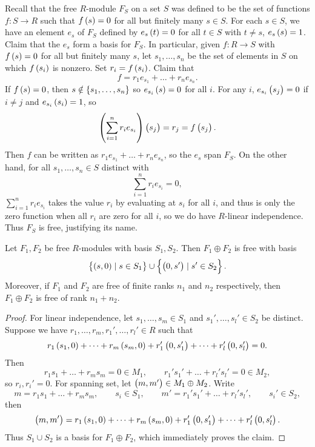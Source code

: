 Recall that the free $ R $-module $ F_S $ on a set $ S $ was defined to be the set of functions $ f : S \to R $ such that $ f\br{s} = 0 $ for all but finitely many $ s \in S $. For each $ s \in S $, we have an element $ e_s $ of $ F_S $ defined by $ e_s\br{t} = 0 $ for all $ t \in S $ with $ t \ne s $, $ e_s\br{s} = 1 $. Claim that the $ e_s $ form a basis for $ F_S $. In particular, given $ f : R \to S $ with $ f\br{s} = 0 $ for all but finitely many $ s $, let $ s_1, \dots, s_n $ be the set of elements in $ S $ on which $ f\br{s_i} $ is nonzero. Set $ r_i = f\br{s_i} $. Claim that
$$ f = r_1e_{s_1} + \dots + r_ne_{s_n}. $$
If $ f\br{s} = 0 $, then $ s \notin \cbr{s_1, \dots, s_n} $ so $ e_{s_i}\br{s} = 0 $ for all $ i $. For any $ i $, $ e_{s_i}\br{s_j} = 0 $ if $ i \ne j $ and $ e_{s_i}\br{s_i} = 1 $, so
$$ \br{\sum_{i = 1}^n r_ie_{s_i}}\br{s_j} = r_j = f\br{s_j}. $$
Then $ f $ can be written as $ r_1e_{s_1} + \dots + r_ne_{s_n} $, so the $ e_s $ span $ F_S $. On the other hand, for all $ s_1, \dots, s_n \in S $ distinct with
$$ \sum_{i = 1}^n r_ie_{s_i} = 0, $$
$ \sum_{i = 1}^n r_ie_{s_i} $ takes the value $ r_i $ by evaluating at $ s_i $ for all $ i $, and thus is only the zero function when all $ r_i $ are zero for all $ i $, so we do have $ R $-linear independence. Thus $ F_S $ is free, justifying its name.

\begin{proposition}
Let $ F_1, F_2 $ be free $ R $-modules with basis $ S_1, S_2 $. Then $ F_1 \oplus F_2 $ is free with basis
$$ \cbr{\br{s, 0} \mid s \in S_1} \cup \cbr{\br{0, s'} \mid s' \in S_2}. $$ Moreover, if $ F_1 $ and $ F_2 $ are free of finite ranks $ n_1 $ and $ n_2 $ respectively, then $ F_1 \oplus F_2 $ is free of rank $ n_1 + n_2 $.
\end{proposition}

\begin{proof}
For linear independence, let $ s_1, \dots, s_m \in S_1 $ and $ s_1', \dots, s_l' \in S_2 $ be distinct. Suppose we have $ r_1, \dots, r_m, r_1', \dots, r_l' \in R $ such that
$$ r_1\br{s_1, 0} + \dots + r_m\br{s_m, 0} + r_1'\br{0, s_1'} + \dots + r_l'\br{0, s_l'} = 0. $$
Then
$$ r_1s_1 + \dots + r_ms_m = 0 \in M_1, \qquad r_1's_1' + \dots + r_l's_l' = 0 \in M_2, $$
so $ r_i, r_i' = 0 $. For spanning set, let $ \br{m, m'} \in M_1 \oplus M_2 $. Write
$$ m = r_1s_1 + \dots + r_ms_m, \qquad s_i \in S_1, \qquad m' = r_1's_1' + \dots + r_l's_l', \qquad s_i' \in S_2, $$
then
$$ \br{m, m'} = r_1\br{s_1, 0} + \dots + r_m\br{s_m, 0} + r_1'\br{0, s_1'} + \dots + r_l'\br{0, s_l'}. $$
Thus $ S_1 \cup S_2 $ is a basis for $ F_1 \oplus F_2 $, which immediately proves the claim.
\end{proof}

